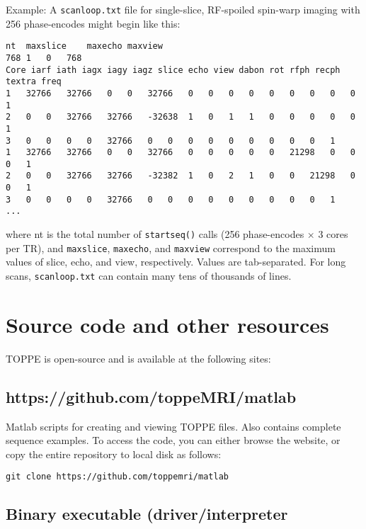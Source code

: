 Example: A {\tt scanloop.txt} file for single-slice, RF-spoiled spin-warp imaging with 256 phase-encodes might begin like this:
\begin{lstlisting}
nt	maxslice	maxecho	maxview
768	1	0	768	
Core iarf iath iagx iagy iagz slice echo view dabon rot rfph recph textra freq
1	32766	32766	0	0	32766	0	0	0	0	0	0	0	0	0	1
2	0	0	32766	32766	-32638	1	0	1	1	0	0	0	0	0	1
3	0	0	0	0	32766	0	0	0	0	0	0	0	0	0	1
1	32766	32766	0	0	32766	0	0	0	0	0	21298	0	0	0	1
2	0	0	32766	32766	-32382	1	0	2	1	0	0	21298	0	0	1
3	0	0	0	0	32766	0	0	0	0	0	0	0	0	0	1
...
\end{lstlisting}
where nt is the total number of {\tt startseq()} calls (256 phase-encodes $\times$ 3 cores per TR), and \texttt{maxslice}, \texttt{maxecho}, and \texttt{maxview} correspond to the maximum values of slice, echo, and view, respectively. %
Values are tab-separated.
For long scans, {\tt scanloop.txt} can contain many tens of thousands of lines.




\section{Source code and other resources}

TOPPE is open-source and is available at the following sites:

\subsection{https://github.com/toppeMRI/matlab}

Matlab scripts for creating and viewing TOPPE files. Also contains complete sequence examples.
To access the code, you can either browse the website, or copy the entire repository to local disk as follows:

\begin{lstlisting}
git clone https://github.com/toppemri/matlab
\end{lstlisting}


\subsection{Binary executable (driver/interpreter}

